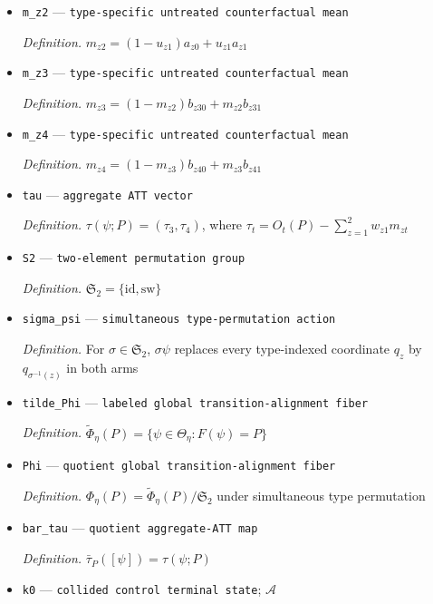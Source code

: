 \documentclass{article}
\begin{document}
\begin{itemize}
  \item \texttt{m\_\allowbreak{}z2} --- \texttt{type-\allowbreak{}specific untreated counterfactual mean}
  \par\smallskip\noindent\emph{Definition.} \(m_{z2}=(1-u_{z1})a_{z0}+u_{z1}a_{z1}\)
  \item \texttt{m\_\allowbreak{}z3} --- \texttt{type-\allowbreak{}specific untreated counterfactual mean}
  \par\smallskip\noindent\emph{Definition.} \(m_{z3}=(1-m_{z2})b_{z30}+m_{z2}b_{z31}\)
  \item \texttt{m\_\allowbreak{}z4} --- \texttt{type-\allowbreak{}specific untreated counterfactual mean}
  \par\smallskip\noindent\emph{Definition.} \(m_{z4}=(1-m_{z3})b_{z40}+m_{z3}b_{z41}\)
  \item \texttt{tau} --- \texttt{aggregate ATT vector}
  \par\smallskip\noindent\emph{Definition.} \(\tau(\psi;P)=(\tau_3,\tau_4)\), where \(\tau_t=O_t(P)-\sum_{z=1}^{2}w_{z1}m_{zt}\)
  \item \texttt{S2} --- \texttt{two-\allowbreak{}element permutation group}
  \par\smallskip\noindent\emph{Definition.} \(\mathfrak S_2=\{\mathrm{id},\mathrm{sw}\}\)
  \item \texttt{sigma\_\allowbreak{}psi} --- \texttt{simultaneous type-\allowbreak{}permutation action}
  \par\smallskip\noindent\emph{Definition.} For \(\sigma\in\mathfrak S_2\), \(\sigma\psi\) replaces every type-indexed coordinate \(q_z\) by \(q_{\sigma^{-1}(z)}\) in both arms
  \item \texttt{tilde\_\allowbreak{}Phi} --- \texttt{labeled global transition-\allowbreak{}alignment fiber}
  \par\smallskip\noindent\emph{Definition.} \(\widetilde\Phi_\eta(P)=\{\psi\in\Theta_\eta:F(\psi)=P\}\)
  \item \texttt{Phi} --- \texttt{quotient global transition-\allowbreak{}alignment fiber}
  \par\smallskip\noindent\emph{Definition.} \(\Phi_\eta(P)=\widetilde\Phi_\eta(P)/\mathfrak S_2\) under simultaneous type permutation
  \item \texttt{bar\_\allowbreak{}tau} --- \texttt{quotient aggregate-\allowbreak{}ATT map}
  \par\smallskip\noindent\emph{Definition.} \(\bar\tau_P([\psi])=\tau(\psi;P)\)
  \item \texttt{k0} --- \texttt{collided control terminal state}; \(\mathcal A\)

\end{itemize}
\end{document}
